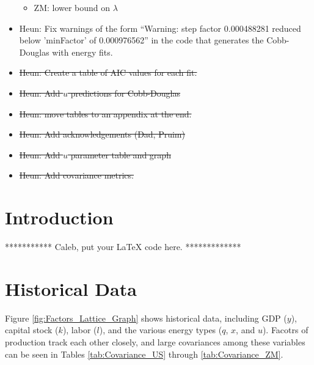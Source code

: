 \documentclass[preprint,authoryear,12pt]{elsarticle}\usepackage{graphicx, color}
\begin{document}
\begin{itemize}
\begin{itemize}
      \item ZM: lower bound on $\lambda$
      \end{itemize}
\item Heun: Fix warnings of the form ``Warning:  step factor 0.000488281 reduced below ’minFactor’ of 0.000976562'' in the code that generates the Cobb-Douglas with energy fits.
\item \st{Heun: Create a table of AIC values for each fit.}
\item \st{Heun: Add $u$ predictions for Cobb-Douglas}
\item \st{Heun: move tables to an appendix at the end.}
\item \st{Heun: Add acknowledgements (Dad, Pruim)}
\item \st{Heun: Add $u$ parameter table and graph}
\item \st{Heun: Add covariance metrics.}
\end{itemize}

\section{Introduction}

*********** Caleb, put your LaTeX code here. *************









\section{Historical Data}

Figure \ref{fig:Factors_Lattice_Graph} shows historical data, including GDP ($y$), capital stock ($k$), labor ($l$), and the various energy types ($q$, $x$, and $u$). Facotrs of production track each other closely, and large covariances among these variables can be seen in Tables \ref{tab:Covariance_US} through \ref{tab:Covariance_ZM}.
\end{document}
